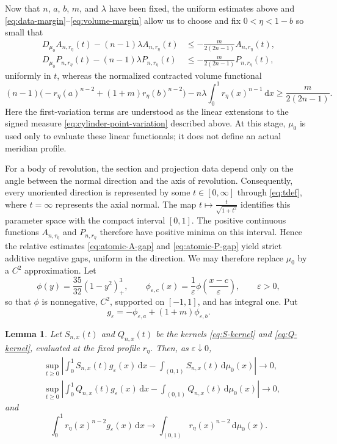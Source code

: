 \documentclass[11pt]{article}
\newtheorem{lemma}[theorem]{Lemma}
\theoremstyle{remark}
\newcommand{\dd}{\,\mathrm{d}}
\newcommand{\pos}[1]{(#1)_{+}}
\begin{document}
Now that $n$, $a$, $b$, $m$, and $\lambda$ have been fixed, the uniform
estimates above and
\eqref{eq:data-margin}--\eqref{eq:volume-margin} allow us to choose and fix
$0<\eta<1-b$ so small that
\begin{align}
 D_{\mu_0}A_{n,r_\eta}(t)-(n-1)\lambda A_{n,r_\eta}(t)
 &\leq-\frac{m}{2(2n-1)}A_{n,r_\eta}(t),\label{eq:atomic-A-gap}\\
 D_{\mu_0}P_{n,r_\eta}(t)-(n-1)\lambda P_{n,r_\eta}(t)
 &\leq-\frac{m}{2(2n-1)}P_{n,r_\eta}(t),\label{eq:atomic-P-gap}
\end{align}
uniformly in $t$, whereas the normalized contracted volume functional
\[
 (n-1)\bigl(-r_\eta(a)^{n-2}+(1+m)r_\eta(b)^{n-2}\bigr)
 -n\lambda\int_0^1r_\eta(x)^{n-1}\dd x
 \geq\frac{m}{2(2n-1)}.
\]
Here the first-variation terms are understood as the linear extensions to
the signed measure \eqref{eq:cylinder-point-variation} described above.
At this stage, $\mu_0$ is used only to evaluate these linear functionals;
it does not define an actual meridian profile.

For a body of revolution, the section and projection data depend only on
the angle between the normal direction and the axis of revolution.
Consequently, every unoriented direction is represented by some
$t\in[0,\infty]$ through \eqref{eq:tdef}, where $t=\infty$ represents the
axial normal.  The map
$
 t\longmapsto\frac{t}{\sqrt{1+t^2}}
$
identifies this parameter space with the compact interval $[0,1]$.  The positive continuous functions
$A_{n,r_\eta}$ and $P_{n,r_\eta}$ therefore have positive minima on this
interval.  Hence the relative estimates \eqref{eq:atomic-A-gap} and
\eqref{eq:atomic-P-gap} yield strict additive negative gaps, uniform in the
direction.  We may therefore replace $\mu_0$ by a $C^2$ approximation.
Let
\begin{equation}\label{eq:bump}
 \phi(y)=\frac{35}{32}\pos{1-y^2}^3,\qquad
 \phi_{\varepsilon,c}(x)=\frac1\varepsilon
 \phi\left(\frac{x-c}{\varepsilon}\right),
 \qquad \varepsilon>0,
\end{equation}
so that $\phi$ is nonnegative, $C^2$, supported on $[-1,1]$, and has
integral one.  Put
\begin{equation}\label{eq:gepsilon}
 g_\varepsilon=-\phi_{\varepsilon,a}+(1+m)\phi_{\varepsilon,b}.
\end{equation}
\begin{lemma}
\label{lem:uniform-bump-approximation}
Let $S_{n,x}(t)$ and $Q_{n,x}(t)$ be the kernels
\eqref{eq:S-kernel} and \eqref{eq:Q-kernel}, evaluated at the fixed
profile $r_\eta$.  Then, as $\varepsilon\downarrow0$,
\begin{align*}
 &\sup_{t\geq0}\left|
   \int_0^1S_{n,x}(t)g_\varepsilon(x)\dd x
   -\int_{(0,1)}S_{n,x}(t)\dd\mu_0(x)
  \right|\longrightarrow0,\\
 &\sup_{t\geq0}\left|
   \int_0^1Q_{n,x}(t)g_\varepsilon(x)\dd x
   -\int_{(0,1)}Q_{n,x}(t)\dd\mu_0(x)
  \right|\longrightarrow0,
\end{align*}
and
\[
 \int_0^1r_\eta(x)^{n-2}g_\varepsilon(x)\dd x
 \longrightarrow
 \int_{(0,1)}r_\eta(x)^{n-2}\dd\mu_0(x).
\]
\end{lemma}
\end{document}
